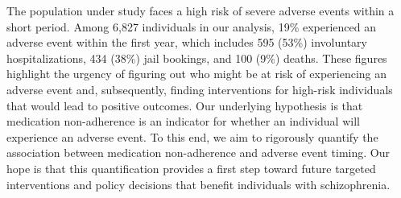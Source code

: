 The population under study faces a high risk of severe adverse events within a short period.  
Among 6,827 individuals in our analysis, 19\% experienced an adverse event within the first year, which includes 595 (53\%) involuntary hospitalizations, 434 (38\%) jail bookings, and 100 (9\%) deaths.
These figures highlight the urgency of figuring out who might be at risk of experiencing an adverse event and, subsequently, finding interventions for high-risk individuals that would lead to positive outcomes.
Our underlying hypothesis is that medication non-adherence is an indicator for whether an individual will experience an adverse event.
To this end, we aim to rigorously quantify the association between medication non-adherence and adverse event timing.
Our hope is that this quantification provides a first step toward future targeted interventions and policy decisions that benefit individuals with schizophrenia.

